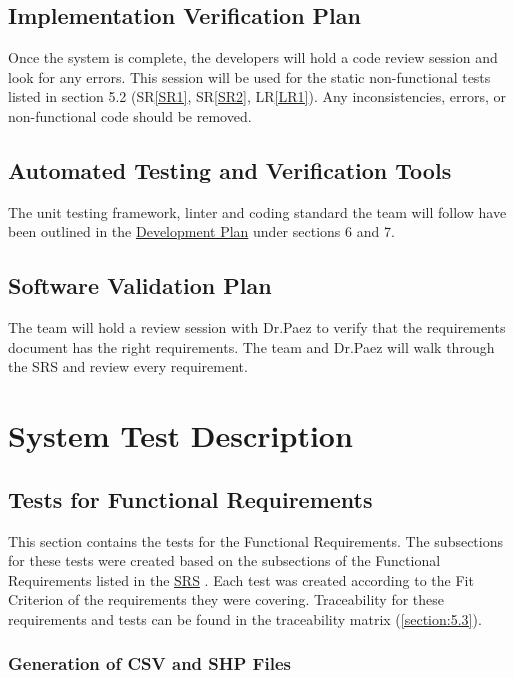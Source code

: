\documentclass[12pt, titlepage]{article}
\begin{document}
\subsection{Implementation Verification Plan}
\label{section:4.5}
Once the system is complete, the developers will hold a code review session and look for any errors. This session will be used for the static non-functional tests listed in section 5.2 (SR\ref{SR1}, SR\ref{SR2}, LR\ref{LR1}). Any inconsistencies, errors, or non-functional code should be removed.

\subsection{Automated Testing and Verification Tools}
\label{section:4.6}
 The unit testing framework, linter and coding standard the team will follow have been outlined in the \href{https://github.com/paezha/PyERT-BLACK/blob/main/docs/DevelopmentPlan/DevelopmentPlan.pdf}{Development Plan} under sections 6 and 7.

\subsection{Software Validation Plan}
\label{section:4.7}

The team will hold a review session with Dr.Paez to verify that the requirements document has the right requirements. The team and Dr.Paez will walk through the SRS and review every requirement.

\section{System Test Description}
\label{section:5}	
\subsection{Tests for Functional Requirements}

This section contains the tests for the Functional Requirements. The subsections for these tests were created based on the subsections of the Functional Requirements listed in the \href{https://github.com/paezha/PyERT-BLACK/blob/main/docs/SRS/SRS.pdf}{SRS} \citep{SRS}. Each test was created according to the Fit Criterion of the requirements they were covering. Traceability for these requirements and tests can be found in the traceability matrix (\ref{section:5.3}). 


\subsubsection{Generation of CSV and SHP Files}
\end{document}
